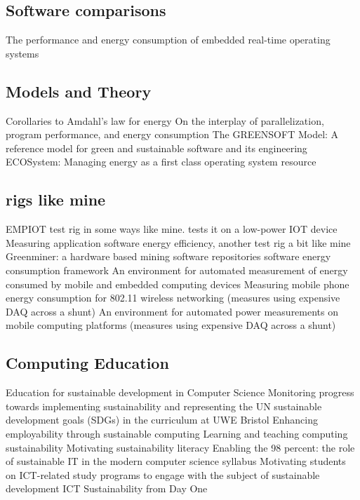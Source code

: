 \subsection{Software comparisons}

\citep{Baynes2003} The performance and energy consumption of embedded real-time operating systems

\subsection{Models and Theory}

\citep{Cho2008} Corollaries to Amdahl's law for energy
\citep{Cho2009} On the interplay of parallelization, program performance, and energy consumption
\citep{Naumann2011} The GREENSOFT Model: A reference model for green and sustainable software and its engineering
\citep{Zeng2002} ECOSystem: Managing energy as a first class operating system resource

\subsection{rigs like mine}

\citep{Dezfouli2018} EMPIOT test rig in some ways like mine. tests it on a low-power IOT device
\citep{Capra2012a} Measuring application software energy efficiency, another test rig a bit like mine
\citep{Hindle2014} Greenminer: a hardware based mining software repositories software energy consumption framework
\citep{Dzhagaryan2016} An environment for automated measurement of energy consumed by mobile and embedded computing devices
\citep{Rice2010} Measuring mobile phone energy consumption for 802.11 wireless networking (measures using expensive DAQ across a shunt)
\citep{Milosevic2013} An environment for automated power measurements on mobile computing platforms (measures using expensive DAQ across a shunt)

\subsection{Computing Education}
\citep{Gordon2010} Education for sustainable development in Computer Science
\citep{Gough2018} Monitoring progress towards implementing sustainability and representing the UN sustainable development goals (SDGs) in the curriculum at UWE Bristol
\citep{Gordon2014} Enhancing employability through sustainable computing
\citep{Hamilton2015} Learning and teaching computing sustainability
\citep{Payne2010} Motivating sustainability literacy
\citep{Cayzer2010} Enabling the 98 percent: the role of sustainable IT in the modern computer science syllabus
\citep{Hilty2018} Motivating students on ICT-related study programs to engage with the subject of sustainable development
\citep{Brooks2019} ICT Sustainability from Day One

